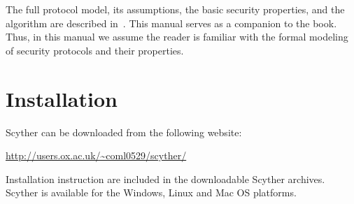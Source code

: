 \documentclass{book}
\begin{document}
The full protocol model, its assumptions, the basic security properties,
and the algorithm are described in~\cite{opsembook}. This manual serves
as a companion to the book.  Thus, in this manual we assume the
reader is familiar with the formal modeling of security protocols and
their properties.

% 

\chapter{Installation}
\label{sec:install}

Scyther can be downloaded from the following website:

\url{http://users.ox.ac.uk/~coml0529/scyther/}

\medskip

\noindent
{}
Installation instruction are included in the downloadable Scyther
archives. Scyther is available for the Windows,
Linux and Mac OS platforms.






\end{document}
